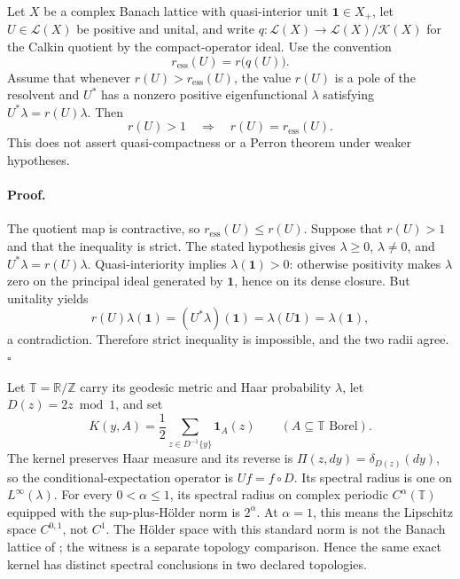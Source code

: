 Let \(X\) be a complex Banach lattice with quasi-interior unit
\(\mathbf1\in X_+\), let \(U\in\mathcal L(X)\) be positive and unital,
and write \(q:\mathcal L(X)\to\mathcal L(X)/\mathcal K(X)\) for the
Calkin quotient by the compact-operator ideal.  Use the convention
\begin{equation}
r_{\mathrm{ess}}(U)=r\bigl(q(U)\bigr).
\label{eq:rg-calkin-essential-radius}
\end{equation}
Assume that whenever \(r(U)>r_{\mathrm{ess}}(U)\), the value \(r(U)\) is a
pole of the resolvent and \(U^*\) has a nonzero positive eigenfunctional
\(\lambda\) satisfying \(U^*\lambda=r(U)\lambda\).  Then
\begin{equation}
r(U)>1\quad\Longrightarrow\quad r(U)=r_{\mathrm{ess}}(U).
\label{eq:rg-unital-essential-spectrum-result}
\end{equation}
This does not assert quasi-compactness or a Perron theorem under weaker
hypotheses. 

\paragraph{Proof.}
The quotient map is contractive, so
\(r_{\mathrm{ess}}(U)\leq r(U)\).  Suppose that \(r(U)>1\) and that the
inequality is strict.  The stated hypothesis gives \(\lambda\geq0\),
\(\lambda\ne0\), and \(U^*\lambda=r(U)\lambda\).  Quasi-interiority
implies \(\lambda(\mathbf1)>0\): otherwise positivity makes \(\lambda\)
zero on the principal ideal generated by \(\mathbf1\), hence on its dense
closure.  But unitality yields
\begin{equation}
r(U)\lambda(\mathbf1)
=(U^*\lambda)(\mathbf1)
=\lambda(U\mathbf1)=\lambda(\mathbf1),
\label{eq:rg-unital-functional-pairing}
\end{equation}
a contradiction.  Therefore strict inequality is impossible, and the two
radii agree.  \(\square\)

Let \(\mathbb T=\mathbb R/\mathbb Z\) carry its geodesic metric and Haar
probability \(\lambda\), let \(D(z)=2z\bmod1\), and set
\begin{equation}
K(y,A)=\frac12\sum_{z\in D^{-1}\{y\}}\mathbf1_A(z)
\qquad(A\subseteq\mathbb T\text{ Borel}).
\label{eq:rg-circle-forward-kernel}
\end{equation}
The kernel preserves Haar measure and its reverse is
\(\Pi(z,dy)=\delta_{D(z)}(dy)\), so the conditional-expectation operator is
\(Uf=f\circ D\).  Its spectral radius is one on
\(L^\infty(\lambda)\).  For every \(0<\alpha\leq1\), its spectral radius
on complex periodic \(C^\alpha(\mathbb T)\) equipped with the sup-plus-H\"older
norm is \(2^\alpha\).  At \(\alpha=1\), this means the Lipschitz space
\(C^{0,1}\), not \(C^1\).  The H\"older space with this standard norm is
not the Banach lattice of ; the
witness is a separate topology comparison.  Hence the same exact kernel has
distinct spectral conclusions in two declared topologies. 


